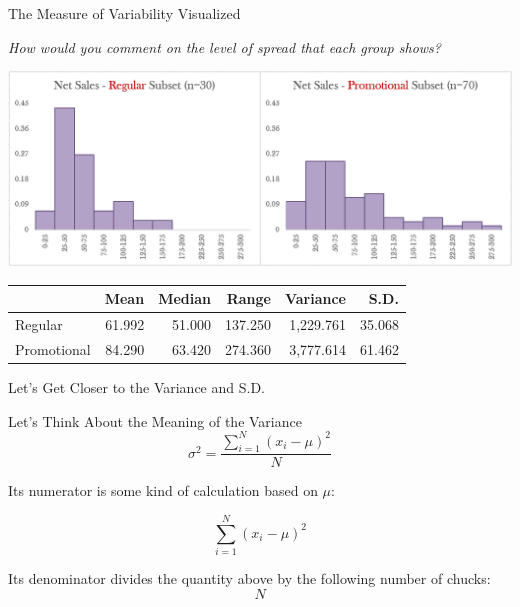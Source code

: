 \documentclass{beamer}
\begin{document}
\begin{frame}{The Measure of Variability Visualized}
\begin{center}

\textit{How would you comment on the level of spread that each group shows?}

\vspace{0.3 cm}

\includegraphics[scale=0.35]{images/ch2NetSalesVarianceTwoGroups.png}



\vspace{0.3 cm}

\begin{scriptsize}
\begin{tabular}{l|r|r|r|r|r}
\hline 
 & Mean & Median & Range & Variance & S.D. \\ 
\hline 
Regular & 61.992 & 51.000 & 137.250 & 1,229.761 & 35.068 \\ 
\hline 
Promotional & 84.290 & 63.420 & 274.360 & 3,777.614 & 61.462 \\ 
\hline 
\end{tabular} 
\end{scriptsize}

\end{center}
\end{frame}



\begin{frame}{Let's Get Closer to the Variance and S.D.}

Let's Think About the Meaning of the Variance 
$$  \sigma^2 = \frac{\sum_{i=1}^N(x_i - \mu)^2}{N} $$

Its numerator is some kind of calculation based on $\mu$:

$$  \sum_{i=1}^N(x_i - \mu)^2 $$

Its denominator divides the quantity above by the following number of chucks: 
$$ N $$

\end{frame}
\end{document}
